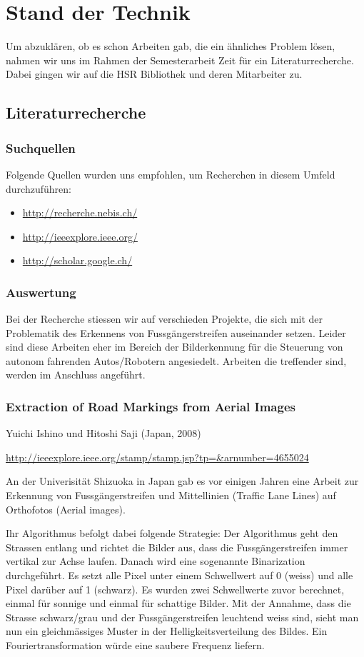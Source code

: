 \section{Stand der Technik}
Um abzuklären, ob es schon Arbeiten gab, die ein ähnliches Problem lösen, nahmen wir uns im Rahmen der Semesterarbeit Zeit für ein Literaturrecherche. Dabei gingen wir auf die HSR Bibliothek und deren Mitarbeiter zu.
\subsection{Literaturrecherche}
\subsubsection{Suchquellen}
Folgende Quellen wurden uns empfohlen, um Recherchen in diesem Umfeld durchzuführen:
\begin{itemize}
	\item \url{http://recherche.nebis.ch/}
    \item \url{http://ieeexplore.ieee.org/}
    \item \url{http://scholar.google.ch/}
\end{itemize}

\subsubsection{Auswertung}
Bei der Recherche stiessen wir auf verschieden Projekte, die sich mit der Problematik des Erkennens von Fussgängerstreifen auseinander setzen. Leider sind diese Arbeiten eher im Bereich der Bilderkennung für die Steuerung von autonom fahrenden Autos/Robotern angesiedelt. Arbeiten die treffender sind, werden im Anschluss angeführt.
\subsubsection{Extraction of Road Markings from Aerial Images}
Yuichi Ishino und Hitoshi Saji (Japan, 2008) \newline 

\onehalfspacing 
\url{http://ieeexplore.ieee.org/stamp/stamp.jsp?tp=\&arnumber=4655024}
\onehalfspacing

An der Univerisität Shizuoka in Japan gab es vor einigen Jahren eine Arbeit zur Erkennung von Fussgängerstreifen und Mittellinien (Traffic Lane Lines) auf Orthofotos (Aerial images).

Ihr Algorithmus befolgt dabei folgende Strategie:
Der Algorithmus geht den Strassen entlang und richtet die Bilder aus, dass die Fussgängerstreifen immer vertikal zur Achse laufen. Danach wird eine sogenannte Binarization durchgeführt. Es setzt alle Pixel unter einem Schwellwert auf 0 (weiss) und alle Pixel darüber auf 1 (schwarz). Es wurden zwei Schwellwerte zuvor berechnet, einmal für sonnige und einmal für schattige Bilder.
Mit der Annahme, dass die Strasse schwarz/grau und der Fussgängerstreifen leuchtend weiss sind, sieht man nun ein gleichmässiges Muster in der Helligkeitsverteilung des Bildes. Ein Fouriertransformation würde eine saubere Frequenz liefern.


